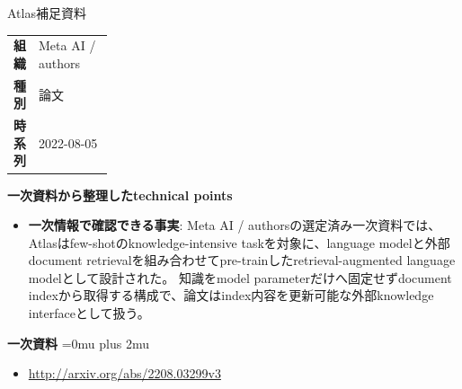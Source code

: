 \begin{technicalnote}{Atlas}{補足資料}
\begingroup
\begin{tabularx}{\linewidth}{@{}>{\bfseries}p{0.22\linewidth}X@{}}
組織 & Meta AI / authors \\
種別 & 論文 \\
時系列 & 2022-08-05 \\
\end{tabularx}
\smallskip
{\bfseries 一次資料から整理したtechnical points}
\begin{itemize}[leftmargin=1.5em,itemsep=0.35em]
\item \textbf{一次情報で確認できる事実}: Meta AI / authorsの選定済み一次資料では、Atlasはfew-shotのknowledge-intensive taskを対象に、language modelと外部document retrievalを組み合わせてpre-trainしたretrieval-augmented language modelとして設計された。 知識をmodel parameterだけへ固定せずdocument indexから取得する構成で、論文はindex内容を更新可能な外部knowledge interfaceとして扱う。
\end{itemize}
\begin{minipage}{\linewidth}
\begin{samepage}
{\bfseries 一次資料}
\begingroup\sloppy
\Urlmuskip=0mu plus 2mu\relax
\begin{itemize}[leftmargin=1.5em,itemsep=0.25em]
\item {\scriptsize\url{http://arxiv.org/abs/2208.03299v3}}
\end{itemize}
\endgroup
\end{samepage}
\end{minipage}
\endgroup
\end{technicalnote}
\medskip
